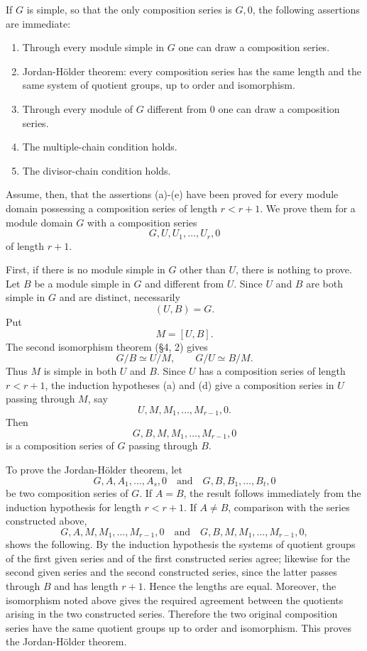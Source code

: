 \documentclass[
  12pt,
]{article}
\begin{document}
If \(G\) is simple, so that the only composition series is \(G,0\), the
following assertions are immediate:

\begin{enumerate}
\def\labelenumi{(\alph{enumi})}
\item
  Through every module simple in \(G\) one can draw a composition
  series.
\item
  Jordan-Hölder theorem: every composition series has the same length
  and the same system of quotient groups, up to order and isomorphism.
\item
  Through every module of \(G\) different from \(0\) one can draw a
  composition series.
\item
  The multiple-chain condition holds.
\item
  The divisor-chain condition holds.
\end{enumerate}

Assume, then, that the assertions (a)-(e) have been proved for every
module domain possessing a composition series of length \(r<r+1\). We
prove them for a module domain \(G\) with a composition series \[
  G,U,U_1,
\ldots,U_r,0
\] of length \(r+1\).

First, if there is no module simple in \(G\) other than \(U\), there is
nothing to prove. Let \(B\) be a module simple in \(G\) and different
from \(U\). Since \(U\) and \(B\) are both simple in \(G\) and are
distinct, necessarily \[
  (U,B)=G.
\] Put \[
  M=[U,B].
\] The second isomorphism theorem (§4, 2) gives \[
  G/B \simeq U/M,
  \qquad
  G/U \simeq B/M.
\] Thus \(M\) is simple in both \(U\) and \(B\). Since \(U\) has a
composition series of length \(r<r+1\), the induction hypotheses (a) and
(d) give a composition series in \(U\) passing through \(M\), say \[
  U,M,M_1,
\ldots,M_{r-1},0.
\] Then \[
  G,B,M,M_1,
\ldots,M_{r-1},0
\] is a composition series of \(G\) passing through \(B\).

To prove the Jordan-Hölder theorem, let \[
  G,A,A_1,
\ldots,A_s,0
  \quad\text{and}\quad
  G,B,B_1,
\ldots,B_t,0
\] be two composition series of \(G\). If \(A=B\), the result follows
immediately from the induction hypothesis for length \(r<r+1\). If
\(A\ne B\), comparison with the series constructed above, \[
  G,A,M,M_1,
\ldots,M_{r-1},0
  \quad\text{and}\quad
  G,B,M,M_1,
\ldots,M_{r-1},0,
\] shows the following. By the induction hypothesis the systems of
quotient groups of the first given series and of the first constructed
series agree; likewise for the second given series and the second
constructed series, since the latter passes through \(B\) and has length
\(r+1\). Hence the lengths are equal. Moreover, the isomorphism noted
above gives the required agreement between the quotients arising in the
two constructed series. Therefore the two original composition series
have the same quotient groups up to order and isomorphism. This proves
the Jordan-Hölder theorem.
\end{document}
